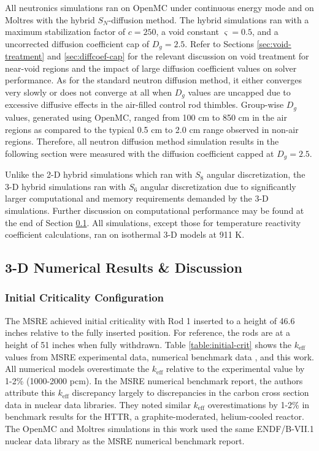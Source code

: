 All neutronics simulations ran on OpenMC under continuous energy mode and on Moltres with the
hybrid $S_N$-diffusion method. The hybrid simulations ran with a maximum stabilization factor of
$c=250$, a void constant $\varsigma=0.5$, and a uncorrected diffusion coefficient cap of $D_g=2.5$.
Refer to Sections \ref{sec:void-treatment} and \ref{sec:diffcoef-cap} for the relevant discussion
on void treatment for near-void regions and the impact of large diffusion coefficient values on
solver performance. As for the standard neutron diffusion method, it either converges very slowly
or does not converge at all when $D_g$ values are uncapped due to excessive diffusive effects in
the air-filled control rod thimbles. Group-wise $D_g$ values, generated using OpenMC, ranged from
100 cm to 850 cm in the air regions as compared to the typical 0.5 cm to 2.0 cm range observed in
non-air regions. Therefore, all neutron diffusion method simulation results in the following
section were measured with the diffusion coefficient capped at $D_g=2.5$.

Unlike the 2-D hybrid simulations which ran with $S_8$ angular discretization, the 3-D hybrid
simulations ran with $S_6$ angular discretization due to significantly
larger computational and memory requirements demanded by the 3-D simulations. Further discussion on
computational performance may be found at the end of Section \ref{sec:3d-nts}. All simulations,
except those for temperature reactivity coefficient calculations, ran on isothermal 3-D models at
911 K. 

\subsection{3-D Numerical Results \& Discussion} \label{sec:3d-nts}

\subsubsection{Initial Criticality Configuration}

The \gls{MSRE} achieved initial criticality with Rod 1 inserted to a height of 46.6 inches relative
to the fully inserted position. For reference, the rods are at a height of 51 inches when fully
withdrawn. Table \ref{table:initial-crit} shows the $k_\text{eff}$ values from \gls{MSRE}
experimental data, numerical benchmark data \cite{fratoni_molten_2020}, and this work. All
numerical models overestimate the $k_\text{eff}$ relative to the experimental value by 1-2\%
(1000-2000 pcm). In the \gls{MSRE} numerical benchmark report, the authors
attribute this $k_\text{eff}$ discrepancy largely to discrepancies in the carbon cross section data
in nuclear data libraries. They noted similar $k_\text{eff}$ overestimations by 1-2\% in benchmark
results for the HTTR, a graphite-moderated, helium-cooled reactor. The OpenMC and Moltres
simulations in this work used the same
ENDF/B-VII.1 nuclear data library as the \gls{MSRE} numerical benchmark report.

